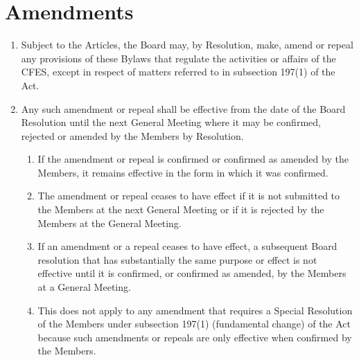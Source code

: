 \section{Amendments}
\label{amendments}

\begin{enumerate}
 \item Subject to the Articles, the Board may, by Resolution, make, amend or repeal any provisions of these Bylaws that regulate the activities or affairs of the CFES, except in respect of matters referred to in subsection 197(1) of the Act.
 \item Any such amendment or repeal shall be effective from the date of the Board Resolution until the next General Meeting where it may be confirmed, rejected or amended by the Members by Resolution.
  \begin{enumerate}
   \item If the amendment or repeal is confirmed or confirmed as amended by the Members, it remains effective in the form in which it was confirmed.
   \item The amendment or repeal ceases to have effect if it is not submitted to the Members at the next General Meeting or if it is rejected by the Members at the General Meeting.
   \item If an amendment or a repeal ceases to have effect, a subsequent Board resolution that has substantially the same purpose or effect is not effective until it is confirmed, or confirmed as amended, by the Members at a General Meeting.
   \item This does not apply to any amendment that requires a Special Resolution of the Members under subsection 197(1) (fundamental change) of the Act because such amendments or repeals are only effective when confirmed by the Members.
  \end{enumerate}
\end{enumerate}
